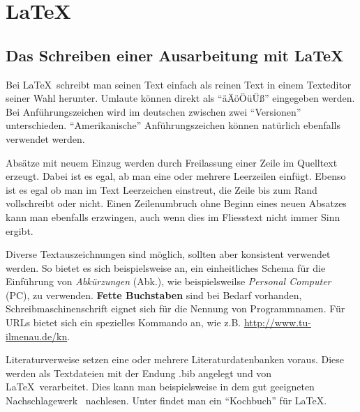 



\chapter{\LaTeX}
\section{Das Schreiben einer Ausarbeitung mit \LaTeX}
Bei \LaTeX\ schreibt man seinen Text einfach als reinen Text in einem
Texteditor seiner Wahl herunter. Umlaute können direkt als "`äÄöÖüÜß"'
eingegeben werden. Bei Anführungszeichen wird im deutschen zwischen
zwei "`Versionen"' unterschieden. ``Amerikanische'' Anführungszeichen
können natürlich ebenfalls verwendet werden.

Absätze mit neuem Einzug werden durch Freilassung einer Zeile im
Quelltext erzeugt. Dabei ist es egal, ab man eine oder mehrere Leerzeilen
einfügt. Ebenso  ist      es egal ob man             
    im Text Leerzeichen einstreut, die Zeile bis zum Rand vollschreibt
oder nicht. Einen Zeilenumbruch ohne Beginn eines neuen Absatzes
\\
kann man ebenfalls erzwingen, auch wenn dies im Fliesstext nicht immer Sinn ergibt.

Diverse Textauszeichnungen sind möglich, sollten aber konsistent verwendet werden.
So bietet es sich beispielsweise an, ein einheitliches Schema für die Einführung von
\emph{Abkürzungen} (Abk.), wie beispielsweilse \emph{Personal Computer} (PC),
zu verwenden. \textbf{Fette Buchstaben} sind bei Bedarf vorhanden,
{\ttfamily Schreibmaschinenschrift} eignet sich für die Nennung von
Programmnamen. Für URLs bietet sich ein spezielles Kommando an,
wie z.B. \url{http://www.tu-ilmenau.de/kn}.


Literaturverweise setzen eine oder mehrere Literaturdatenbanken voraus.
Diese werden als Textdateien mit der Endung {\ttfamily .bib} angelegt und
von \LaTeX\ verarbeitet. Dies kann man beispielsweise in dem gut
geeigneten Nachschlagewerk~\cite{book:latex} nachlesen. Unter
\cite{link:latexkochbuch} findet man ein "`Kochbuch"' für \LaTeX.

